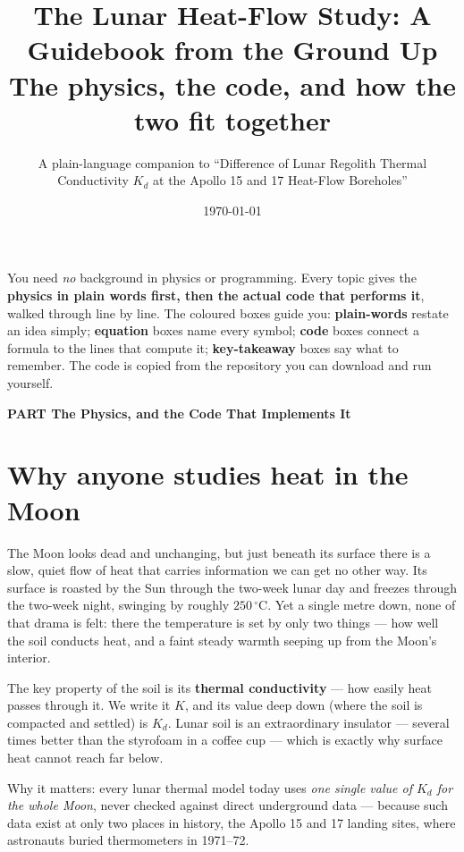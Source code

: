 \documentclass[11pt]{article}
\title{\vspace{-1.4cm}\bfseries The Lunar Heat-Flow Study:
A Guidebook from the Ground Up\\[2pt]
\large\normalfont The physics, the code, and how the two fit together}
\author{\normalsize A plain-language companion to ``Difference of Lunar Regolith
Thermal\\ Conductivity $K_d$ at the Apollo 15 and 17 Heat-Flow Boreholes''}
\date{\normalsize\today}
\newcounter{partno}
\newcommand{\partdivider}[1]{%
  \par\addvspace{10pt}\refstepcounter{partno}\FloatBarrier
  \noindent\begin{tcolorbox}[colback=teal!14!white,colframe=teal!50!black,
    boxrule=1pt,arc=2pt,left=10pt,right=10pt,top=5pt,bottom=5pt,
    before skip=4pt,after skip=6pt]
  \centering\large\bfseries\color{teal!40!black}
  PART \Roman{partno}\quad\textbullet\quad #1\end{tcolorbox}\par\addvspace{3pt}}
\renewcommand{\partdivider}[1]{\par\addvspace{10pt}\refstepcounter{partno}%
    \FloatBarrier\noindent\begin{tcolorbox}[colback=gray!15!white,colframe=black,
      boxrule=1pt,arc=2pt,left=10pt,right=10pt,top=5pt,bottom=5pt,
      before skip=4pt,after skip=6pt]\centering\large\bfseries\color{black}
    PART \Roman{partno}\quad\textbullet\quad #1\end{tcolorbox}\par\addvspace{3pt}}
\begin{document}
\maketitle
\vspace{-0.7cm}

\begin{plainbox}[title={How to use this book}]
You need \emph{no} background in physics or programming. Every topic
gives the \textbf{physics in plain words first, then the actual code that
performs it}, walked through line by line. The coloured boxes guide you:
\textcolor{teal!60!black}{\textbf{plain-words}} restate an idea simply;
\textcolor{coral!55!black}{\textbf{equation}} boxes name every symbol;
\textcolor{gray!55!black}{\textbf{code}} boxes connect a formula to the
lines that compute it; \textcolor{orange!60!black}{\textbf{key-takeaway}}
boxes say what to remember. The code is copied from the repository you
can download and run yourself.
\end{plainbox}

{\small\setlength{\parskip}{0pt}\tableofcontents}

\partdivider{The Physics, and the Code That Implements It}

\section{Why anyone studies heat in the Moon}
The Moon looks dead and unchanging, but just beneath its surface there is
a slow, quiet flow of heat that carries information we can get no other
way. Its surface is roasted by the Sun through the two-week lunar day and
freezes through the two-week night, swinging by roughly $250\,^\circ$C.
Yet a single metre down, none of that drama is felt: there the
temperature is set by only two things --- how well the soil conducts
heat, and a faint steady warmth seeping up from the Moon's interior.

The key property of the soil is its \textbf{thermal conductivity} --- how
easily heat passes through it. We write it $K$, and its value deep down
(where the soil is compacted and settled) is $K_d$. Lunar soil is an
extraordinary insulator --- several times better than the styrofoam in a
coffee cup --- which is exactly why surface heat cannot reach far below.

Why it matters: every lunar thermal model today uses \emph{one single
value of $K_d$ for the whole Moon}, never checked against direct
underground data --- because such data exist at only two places in
history, the Apollo 15 and 17 landing sites, where astronauts buried
thermometers in 1971--72.
\end{document}
